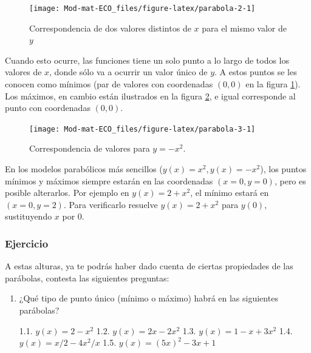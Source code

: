 \documentclass[
]{book}
\begin{document}
\begin{figure}

{\centering \texttt{[image: Mod-mat-ECO\_files/figure-latex/parabola-2-1]} 

}

\caption{Correspondencia de dos valores distintos de $x$ para el mismo valor de $y$}\label{fig:parabola-2}
\end{figure}

Cuando esto ocurre, las funciones tiene un solo punto a lo largo de todos los valores de \(x\), donde sólo va a ocurrir un valor único de \(y\). A estos puntos se les conocen como mínimos (par de valores con coordenadas \((0, 0)\) en la figura \ref{fig:parabola-2}). Los máximos, en cambio están ilustrados en la figura \ref{fig:parabola-3}, e igual corresponde al punto con coordenadas \((0, 0)\).

\begin{figure}

{\centering \texttt{[image: Mod-mat-ECO\_files/figure-latex/parabola-3-1]} 

}

\caption{Correspondencia de valores para $y = -x^2$.}\label{fig:parabola-3}
\end{figure}

En los modelos parabólicos más sencillos (\(y(x) = x^2, y(x) = -x^2\)), los puntos mínimos y máximos siempre estarán en las coordenadas \((x = 0, y = 0)\), pero es posible alterarlos. Por ejemplo en \(y(x) = 2 + x^2\), el mínimo estará en \((x = 0, y = 2)\). Para verificarlo resuelve \(y(x) = 2 + x^2\) para \(y(0)\), sustituyendo \(x\) por \(0\).

\hypertarget{ejercicio}{%
\subsubsection{Ejercicio}\label{ejercicio}}

A estas alturas, ya te podrás haber dado cuenta de ciertas propiedades de las parábolas, contesta las siguientes preguntas:

\begin{enumerate}
\def\labelenumi{\arabic{enumi}.}
\item
  ¿Qué tipo de punto único (mínimo o máximo) habrá en las siguientes parábolas?

  1.1. \(y(x) = 2 - x^2\)
  1.2. \(y(x) = 2x - 2x^2\)
  1.3. \(y(x) = 1 - x + 3x^2\)
  1.4. \(y(x) = x/2 - 4x^2/x\)
  1.5. \(y(x) = (5x)^2 - 3x + 1\)
\end{enumerate}
\end{document}
